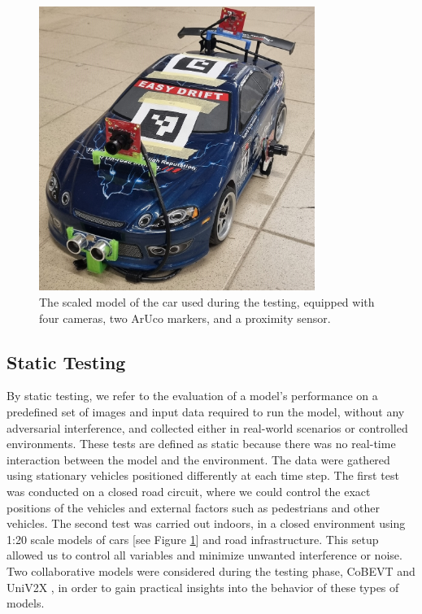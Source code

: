 \begin{figure}[ht]
    \centering
    \includegraphics[width=0.8\textwidth]{figures/introduction/scale_car}
    \caption{The scaled model of the car used during the testing, equipped with four cameras, two ArUco markers, and a proximity sensor.}
    \label{scale-car}
\end{figure}

\subsection{Static Testing}

By static testing, we refer to the evaluation of a model’s performance on a predefined set of images and input data required to run the model, without any adversarial interference, and collected either in real-world scenarios or controlled environments.
These tests are defined as static because there was no real-time interaction between the model and the environment. The data were gathered using stationary vehicles positioned differently at each time step.
The first test was conducted on a closed road circuit, where we could control the exact positions of the vehicles and external factors such as pedestrians and other vehicles.
The second test was carried out indoors, in a closed environment using 1:20 scale models of cars [see Figure \ref{scale-car}] and road infrastructure. This setup allowed us to control all variables and minimize unwanted interference or noise.
Two collaborative models were considered during the testing phase, CoBEVT \cite{xu2022cobevtcooperativebirdseye} and UniV2X \cite{yu2024_univ2x}, in order to gain practical insights into the behavior of these types of models.

